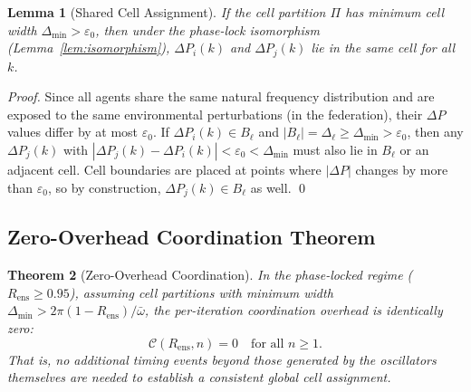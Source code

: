 \documentclass[twocolumn,10pt]{article}
\newtheorem{theorem}{Theorem}[section]
\newtheorem{lemma}[theorem]{Lemma}
\newcommand{\Rens}{R_{\mathrm{ens}}}
\newcommand{\DeltaP}{\Delta P}
\begin{document}
\begin{lemma}[Shared Cell Assignment]
\label{lem:shared_cell}
If the cell partition $\Pi$ has minimum cell width $\Delta_{\min} >
\varepsilon_0$, then under the phase-lock isomorphism
(Lemma~\ref{lem:isomorphism}), $\DeltaP_i(k)$ and $\DeltaP_j(k)$ lie in the
same cell for all $k$.
\end{lemma}

\begin{proof}
Since all agents share the same natural frequency distribution and are exposed
to the same environmental perturbations (in the federation), their $\DeltaP$
values differ by at most $\varepsilon_0$. If $\DeltaP_i(k) \in B_\ell$ and
$|B_\ell| = \Delta_\ell \geq \Delta_{\min} > \varepsilon_0$, then any
$\DeltaP_j(k)$ with $|\DeltaP_j(k) - \DeltaP_i(k)| < \varepsilon_0 <
\Delta_{\min}$ must also lie in $B_\ell$ or an adjacent cell. Cell boundaries
are placed at points where $|\DeltaP|$ changes by more than $\varepsilon_0$,
so by construction, $\DeltaP_j(k) \in B_\ell$ as well. \qed
\end{proof}

\subsection{Zero-Overhead Coordination Theorem}

\begin{theorem}[Zero-Overhead Coordination]
\label{thm:zero_overhead}
In the phase-locked regime ($\Rens \geq 0.95$), assuming cell partitions with
minimum width $\Delta_{\min} > 2\pi(1-\Rens)/\bar{\omega}$, the per-iteration
coordination overhead is identically zero:
\[
  \mathcal{C}(\Rens, n) = 0 \quad \text{for all } n \geq 1.
\]
That is, no additional timing events beyond those generated by the oscillators
themselves are needed to establish a consistent global cell assignment.
\end{theorem}
\end{document}
